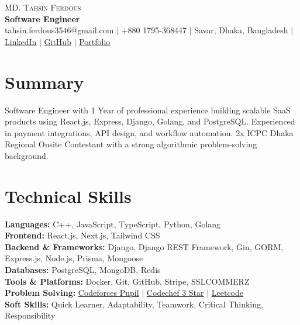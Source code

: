 \documentclass[letterpaper,10.5pt]{article}
\begin{document}
\begin{center}
    {\LARGE \scshape MD. Tahsin Ferdous} \\ \vspace{4pt}
    {\large\bfseries Software Engineer} \\ \vspace{6pt}
    \small
    tahsin.ferdous3546@gmail.com $|$
    +880 1795-368447 $|$
    Savar, Dhaka, Bangladesh $|$
    \href{https://www.linkedin.com/in/md-tahsin-ferdous/}{LinkedIn} $|$
    \href{https://github.com/tahsin005}{GitHub} $|$
    \href{https://tahsin-exe.vercel.app/}{Portfolio}
\end{center}

\section{Summary}
\small{Software Engineer with 1 Year of professional experience building scalable SaaS products using React.js, Express, Django, Golang, and PostgreSQL. Experienced in payment integrations, API design, and workflow automation. 2x ICPC Dhaka Regional Onsite Contestant with a strong algorithmic problem-solving background.}


\section{Technical Skills}
 \begin{itemize}[leftmargin=0.15in, label={}]
    \small{\item{
     \textbf{Languages:}{ C++, JavaScript, TypeScript, Python, Golang} \\[2pt]
     \textbf{Frontend:}{ React.js, Next.js, Tailwind CSS} \\[2pt]
     \textbf{Backend \& Frameworks:}{ Django, Django REST Framework, Gin, GORM, Express.js, Node.js, Prisma, Mongoose} \\[2pt]
     \textbf{Databases:}{ PostgreSQL, MongoDB, Redis} \\[2pt]
     \textbf{Tools \& Platforms:}{ Docker, Git, GitHub, Stripe, SSLCOMMERZ} \\[2pt]
     \textbf{Problem Solving:} \href{https://codeforces.com/profile/tahsin_ferdous}{Codeforces Pupil} $|$  \href{https://www.codechef.com/users/tahsinferdous3}{Codechef 3 Star}  $|$  \href{https://leetcode.com/u/md-tahsin-ferdous/}{Leetcode} \\[2pt]
     \textbf{Soft Skills:}{ Quick Learner, Adaptability, Teamwork, Critical Thinking, Responsibility}
    }}
 \end{itemize}
\end{document}
